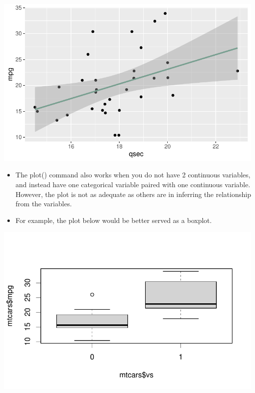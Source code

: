 \documentclass[
  letterpaper,
  DIV=11,
  numbers=noendperiod]{scrreprt}
\newenvironment{Shaded}{\begin{snugshade}}{\end{snugshade}}
\newcommand{\FunctionTok}[1]{\textcolor[rgb]{0.28,0.35,0.67}{#1}}
\newcommand{\NormalTok}[1]{\textcolor[rgb]{0.00,0.23,0.31}{#1}}
\newcommand{\SpecialCharTok}[1]{\textcolor[rgb]{0.37,0.37,0.37}{#1}}
\providecommand{\tightlist}{%
  \setlength{\itemsep}{0pt}\setlength{\parskip}{0pt}}\usepackage{longtable,booktabs,array}
\begin{document}
\includegraphics{dataviz_files/figure-pdf/unnamed-chunk-53-1.pdf}

\begin{itemize}
\tightlist
\item
  The plot() command also works when you do not have 2 continuous
  variables, and instead have one categorical variable paired with one
  continuous variable. However, the plot is not as adequate as others
  are in inferring the relationship from the variables.
\item
  For example, the plot below would be better served as a boxplot.
\end{itemize}

\begin{Shaded}
\end{Shaded}

\includegraphics{dataviz_files/figure-pdf/unnamed-chunk-54-1.pdf}
\end{document}
